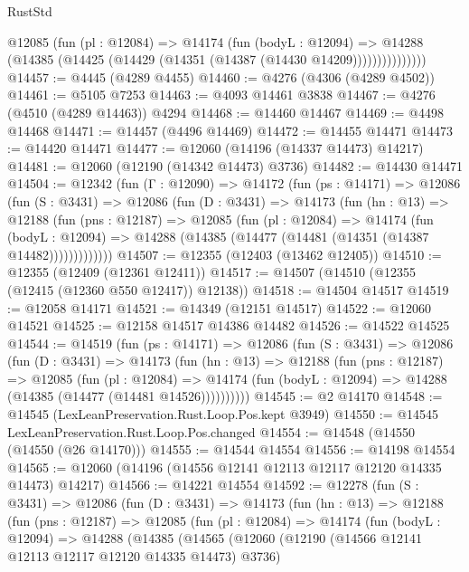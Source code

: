 \begin{lexlean}{RustStd}
\begin{coremodule}
                @12085
                  (fun (pl : @12084) =>
                  @14174
                    (fun (bodyL : @12094) =>
                    @14288 (@14385 (@14425 (@14429 (@14351 (@14387 (@14430 @14209)))))))))))))))
@14457 := @4445 (@4289 @4455)
@14460 := @4276 (@4306 (@4289 @4502))
@14461 := @5105 @7253
@14463 := @4093 @14461 @3838
@14467 := @4276 (@4510 (@4289 @14463)) @4294
@14468 := @14460 @14467
@14469 := @4498 @14468
@14471 := @14457 (@4496 @14469)
@14472 := @14455 @14471
@14473 := @14420 @14471
@14477 := @12060 (@14196 (@14337 @14473) @14217)
@14481 := @12060 (@12190 (@14342 @14473) @3736)
@14482 := @14430 @14471
@14504 := @12342
    (fun (Γ : @12090) =>
    @14172
      (fun (ps : @14171) =>
      @12086
        (fun (S : @3431) =>
        @12086
          (fun (D : @3431) =>
          @14173
            (fun (hn : @13) =>
            @12188
              (fun (pns : @12187) =>
              @12085
                (fun (pl : @12084) =>
                @14174
                  (fun (bodyL : @12094) =>
                  @14288 (@14385 (@14477 (@14481 (@14351 (@14387 @14482)))))))))))))
@14507 := @12355 (@12403 (@13462 @12405))
@14510 := @12355 (@12409 (@12361 @12411))
@14517 := @14507 (@14510 (@12355 (@12415 (@12360 @550 @12417)) @12138))
@14518 := @14504 @14517
@14519 := @12058 @14171
@14521 := @14349 (@12151 @14517)
@14522 := @12060 @14521
@14525 := @12158 @14517 @14386 @14482
@14526 := @14522 @14525
@14544 := @14519
    (fun (ps : @14171) =>
    @12086
      (fun (S : @3431) =>
      @12086
        (fun (D : @3431) =>
        @14173
          (fun (hn : @13) =>
          @12188
            (fun (pns : @12187) =>
            @12085
              (fun (pl : @12084) =>
              @14174 (fun (bodyL : @12094) => @14288 (@14385 (@14477 (@14481 @14526))))))))))
@14545 := @2 @14170
@14548 := @14545 (LexLeanPreservation.Rust.Loop.Pos.kept @3949)
@14550 := @14545 LexLeanPreservation.Rust.Loop.Pos.changed
@14554 := @14548 (@14550 (@14550 (@26 @14170)))
@14555 := @14544 @14554
@14556 := @14198 @14554
@14565 := @12060 (@14196 (@14556 @12141 @12113 @12117 @12120 @14335 @14473) @14217)
@14566 := @14221 @14554
@14592 := @12278
    (fun (S : @3431) =>
    @12086
      (fun (D : @3431) =>
      @14173
        (fun (hn : @13) =>
        @12188
          (fun (pns : @12187) =>
          @12085
            (fun (pl : @12084) =>
            @14174
              (fun (bodyL : @12094) =>
              @14288
                (@14385
                  (@14565
                    (@12060
                      (@12190 (@14566 @12141 @12113 @12117 @12120 @14335 @14473) @3736)

\end{coremodule}
\end{lexlean}
